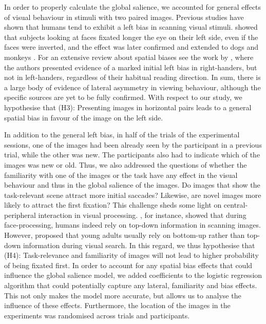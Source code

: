 {In order to properly calculate the global salience, we accounted for general effects of visual behaviour in stimuli with two paired images. Previous studies have shown that humans tend to exhibit a left bias in scanning visual stimuli. \citet{barton2006leftbias} showed that subjects looking at faces fixated longer the eye on their left side, even if the faces were inverted, and the effect was later confirmed and extended to dogs and monkeys \citep{guo2009leftbias}. For an extensive review about spatial biases see the work by \citet{ossandon2014spatialbiases}, where the authors presented evidence of a marked initial left bias in right-handers, but not in left-handers, regardless of their habitual reading direction. In sum, there is a large body of evidence of lateral asymmetry in viewing behaviour, although the specific sources are yet to be fully confirmed. With respect to our study, we hypothesise that (H3): Presenting images in horizontal pairs leads to a general spatial bias in favour of the image on the left side. 

In addition to the general left bias, in half of the trials of the experimental sessions, one of the images had been already seen by the participant in a previous trial, while the other was new. The participants also had to indicate which of the images was new or old. Thus, we also addressed the questions of whether the familiarity with one of the images or the task have any effect in the visual behaviour and thus in the global salience of the images. Do images that show the task-relevant scene attract more initial saccades? Likewise, are novel images more likely to attract the first fixation? This challenge sheds some light on central-peripheral interaction in visual processing. \citet{guo2007topdown}, for instance, showed that during face-processing, humans indeed rely on top-down information in scanning images. However, \citet{acik2010bottomuptopdown} proposed that young adults usually rely on bottom-up rather than top-down information during visual search. In this regard, we thus hypothesise that (H4): Task-relevance and familiarity of images will not lead to higher probability of being fixated first. In order to account for any spatial bias effects that could influence the global salience model, we added coefficients to the logistic regression algorithm that could potentially capture any lateral, familiarity and bias effects. This not only makes the model more accurate, but allows us to analyse the influence of these effects. Furthermore, the location of the images in the experiments was randomised across trials and participants. 

}
